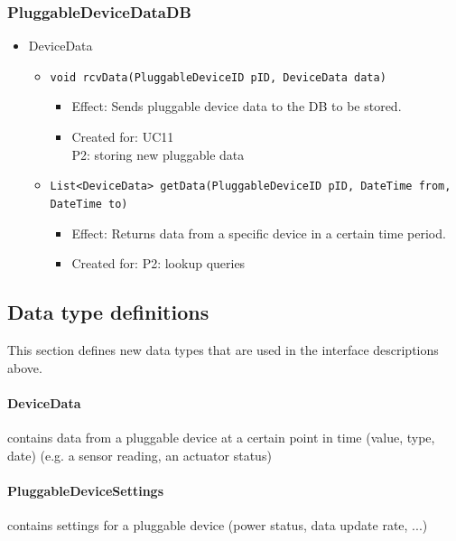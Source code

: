     \subsubsection{PluggableDeviceDataDB}
        \begin{itemize}
            \item DeviceData
            \begin{itemize}
                \item \texttt{void rcvData(PluggableDeviceID pID, DeviceData data)}
                \begin{itemize}
                    \item Effect: Sends pluggable device data to the DB to be stored.
                    \item Created for: UC11 \\
                          P2: storing new pluggable data
                \end{itemize}
                \item \texttt{List<DeviceData> getData(PluggableDeviceID pID, DateTime from, DateTime to)}
                \begin{itemize}
                    \item Effect: Returns data from a specific device in a certain time period.
                    \item Created for: P2: lookup queries
                \end{itemize}
            \end{itemize}
        \end{itemize}


\subsection{Data type definitions}
    This section defines new data types that are used in the interface descriptions above.

    \paragraph{DeviceData}
               contains data from a pluggable device at a certain point in time
               (value, type, date) (e.g. a sensor reading, an actuator status)
    \paragraph{PluggableDeviceSettings}
              contains settings for a pluggable device (power status,
              data update rate, ...)
